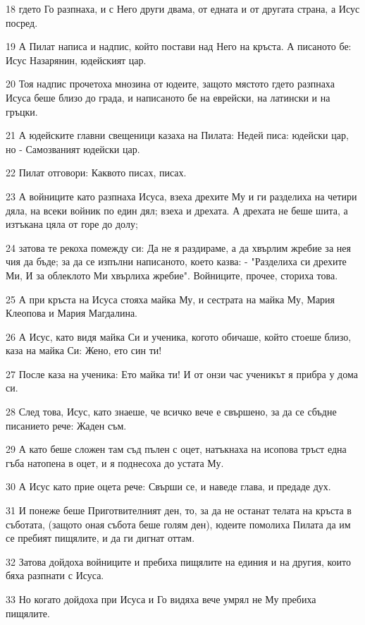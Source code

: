 \par 18 гдето Го разпнаха, и с Него други двама, от едната и от другата страна, а Исус посред.
\par 19 А Пилат написа и надпис, който постави над Него на кръста. А писаното бе: Исус Назарянин, юдейският цар.
\par 20 Тоя надпис прочетоха мнозина от юдеите, защото мястото гдето разпнаха Исуса беше близо до града, и написаното бе на еврейски, на латински и на гръцки.
\par 21 А юдейските главни свещеници казаха на Пилата: Недей писа: юдейски цар, но - Самозваният юдейски цар.
\par 22 Пилат отговори: Каквото писах, писах.
\par 23 А войниците като разпнаха Исуса, взеха дрехите Му и ги разделиха на четири дяла, на всеки войник по един дял; взеха и дрехата. А дрехата не беше шита, а изтъкана цяла от горе до долу;
\par 24 затова те рекоха помежду си: Да не я раздираме, а да хвърлим жребие за нея чия да бъде; за да се изпълни написаното, което казва: - "Разделиха си дрехите Ми, И за облеклото Ми хвърлиха жребие". Войниците, прочее, сториха това.
\par 25 А при кръста на Исуса стояха майка Му, и сестрата на майка Му, Мария Клеопова и Мария Магдалина.
\par 26 А Исус, като видя майка Си и ученика, когото обичаше, който стоеше близо, каза на майка Си: Жено, ето син ти!
\par 27 После каза на ученика: Ето майка ти! И от онзи час ученикът я прибра у дома си.
\par 28 След това, Исус, като знаеше, че всичко вече е свършено, за да се сбъдне писанието рече: Жаден съм.
\par 29 А като беше сложен там съд пълен с оцет, натъкнаха на исопова тръст една гъба натопена в оцет, и я поднесоха до устата Му.
\par 30 А Исус като прие оцета рече: Свърши се, и наведе глава, и предаде дух.
\par 31 И понеже беше Приготвителният ден, то, за да не останат телата на кръста в съботата, (защото оная събота беше голям ден), юдеите помолиха Пилата да им се пребият пищялите, и да ги дигнат оттам.
\par 32 Затова дойдоха войниците и пребиха пищялите на единия и на другия, които бяха разпнати с Исуса.
\par 33 Но когато дойдоха при Исуса и Го видяха вече умрял не Му пребиха пищялите.
